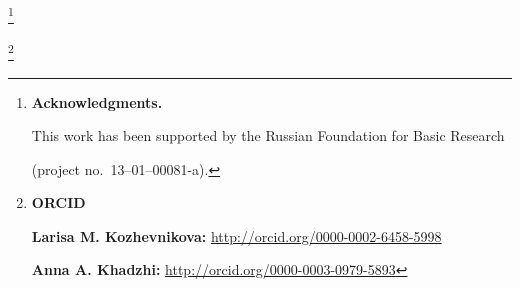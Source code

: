 \RuDate





\newpage





\makeentitle





\thanks{\textbf{Acknowledgments.}

This work has been  supported by the Russian Foundation for Basic Research

 (project no.~13--01--00081-a).}





\thanks{{{\bf ORCID}







{\bf Larisa M. Kozhevnikova:} \url{http://orcid.org/0000-0002-6458-5998}



{\bf Anna A. Khadzhi:} \url{http://orcid.org/0000-0003-0979-5893}



}}











\EngRef

\English



